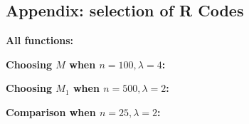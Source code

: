 \documentclass{article}
\begin{document}
	\newpage



\begin{appendix}
\section*{Appendix: selection of R Codes}
\textbf{All functions:}


\textbf{Choosing $M$ when $n = 100, \lambda = 4$:}


\textbf{Choosing $M_1$ when $n=500, \lambda = 2$:}


\textbf{Comparison when $n = 25, \lambda = 2$:}

\end{appendix}

 	


	
	
	
	
\end{document}
